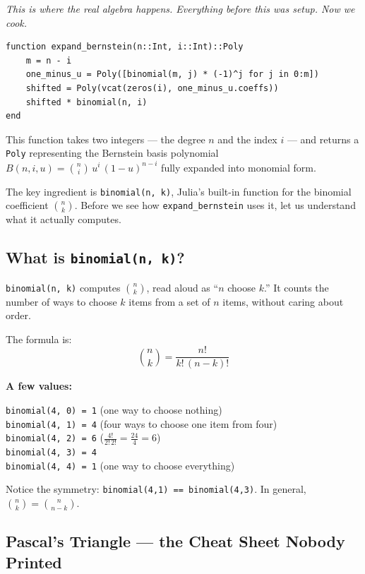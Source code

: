 \documentclass[12pt, a4paper]{article}
\newcommand{\cd}[1]{\texttt{#1}}
\begin{document}
\textit{This is where the real algebra happens.
Everything before this was setup.
Now we cook.}

\begin{verbatim}
function expand_bernstein(n::Int, i::Int)::Poly
    m = n - i
    one_minus_u = Poly([binomial(m, j) * (-1)^j for j in 0:m])
    shifted = Poly(vcat(zeros(i), one_minus_u.coeffs))
    shifted * binomial(n, i)
end
\end{verbatim}

This function takes two integers --- the degree $n$ and the index $i$
--- and returns a \cd{Poly} representing the Bernstein basis polynomial
$B(n, i, u) = \binom{n}{i}\,u^i\,(1-u)^{n-i}$ fully expanded
into monomial form.

The key ingredient is \cd{binomial(n, k)}, Julia's built-in
function for the binomial coefficient $\binom{n}{k}$.
Before we see how \cd{expand\_bernstein} uses it,
let us understand what it actually computes.

\subsection{What is \texttt{binomial(n, k)}?}

\cd{binomial(n, k)} computes $\binom{n}{k}$,
read aloud as ``$n$ choose $k$.''
It counts the number of ways to choose $k$ items
from a set of $n$ items, without caring about order.

The formula is:
\[
  \binom{n}{k} = \frac{n!}{k!\,(n-k)!}
\]

\begin{examplebox}
\textbf{A few values:}

\medskip
\cd{binomial(4, 0) = 1} \quad (one way to choose nothing) \\
\cd{binomial(4, 1) = 4} \quad (four ways to choose one item from four) \\
\cd{binomial(4, 2) = 6} \quad ($\frac{4!}{2!\,2!} = \frac{24}{4} = 6$) \\
\cd{binomial(4, 3) = 4} \\
\cd{binomial(4, 4) = 1} \quad (one way to choose everything)

\medskip
Notice the symmetry: \cd{binomial(4,1) == binomial(4,3)}.
In general, $\binom{n}{k} = \binom{n}{n-k}$.
\end{examplebox}

\subsection{Pascal's Triangle --- the Cheat Sheet Nobody Printed}
\end{document}
